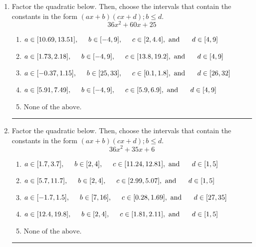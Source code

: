 \documentclass[14pt]{extbook}
\newcommand{\litem}[1]{\item#1\hspace*{-1cm}\rule{\textwidth}{0.4pt}}
\begin{document}
\begin{enumerate}
{\begin{enumerate}[label=\Alph*.]
\end{enumerate} }
\litem{
Factor the quadratic below. Then, choose the intervals that contain the constants in the form $(ax+b)(cx+d); b \leq d.$\[ 36x^{2} +60 x + 25 \]\begin{enumerate}[label=\Alph*.]
\item \( a \in [10.69, 13.51], \hspace*{5mm} b \in [-4, 9], \hspace*{5mm} c \in [2, 4.4], \text{ and } \hspace*{5mm} d \in [4, 9] \)
\item \( a \in [1.73, 2.18], \hspace*{5mm} b \in [-4, 9], \hspace*{5mm} c \in [13.8, 19.2], \text{ and } \hspace*{5mm} d \in [4, 9] \)
\item \( a \in [-0.37, 1.15], \hspace*{5mm} b \in [25, 33], \hspace*{5mm} c \in [0.1, 1.8], \text{ and } \hspace*{5mm} d \in [26, 32] \)
\item \( a \in [5.91, 7.49], \hspace*{5mm} b \in [-4, 9], \hspace*{5mm} c \in [5.9, 6.9], \text{ and } \hspace*{5mm} d \in [4, 9] \)
\item \( \text{None of the above.} \)

\end{enumerate} }
\litem{
Factor the quadratic below. Then, choose the intervals that contain the constants in the form $(ax+b)(cx+d); b \leq d.$\[ 36x^{2} +35 x + 6 \]\begin{enumerate}[label=\Alph*.]
\item \( a \in [1.7, 3.7], \hspace*{5mm} b \in [2, 4], \hspace*{5mm} c \in [11.24, 12.81], \text{ and } \hspace*{5mm} d \in [1, 5] \)
\item \( a \in [5.7, 11.7], \hspace*{5mm} b \in [2, 4], \hspace*{5mm} c \in [2.99, 5.07], \text{ and } \hspace*{5mm} d \in [1, 5] \)
\item \( a \in [-1.7, 1.5], \hspace*{5mm} b \in [7, 16], \hspace*{5mm} c \in [0.28, 1.69], \text{ and } \hspace*{5mm} d \in [27, 35] \)
\item \( a \in [12.4, 19.8], \hspace*{5mm} b \in [2, 4], \hspace*{5mm} c \in [1.81, 2.11], \text{ and } \hspace*{5mm} d \in [1, 5] \)
\item \( \text{None of the above.} \)


\end{enumerate}}
\end{enumerate}
\end{document}

